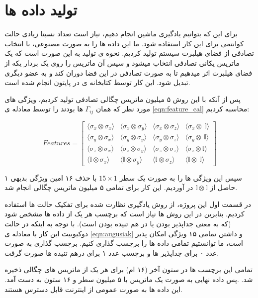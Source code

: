 \section{تولید داده ها}

برای این که بتوانیم یادگیری ماشین انجام دهیم، نیاز است تعداد نسبتا زیادی حالت کوانتمی برای این کار استفاده شود.
ما این داده ها را به صورت مصنوعی، با انتخاب تصادفی از فضای هیلبرت سیستم تولید کردیم.
نحوه ی تولید به این صورت است که یک ماتریس یکانی تصادفی انتخاب میشود و سپس آن ماتریس را روی یک بردار یکه از فضای هیلبرت اثر میدهیم تا به صورت تصادفی در این فضا دوران کند و به عضو دیگری تبدیل شود.
این کار توسط کتابخانه ی
در پایتون انجام شده است.

پس از آنکه با این روش ۵ میلیون ماتریس چگالی تصادفی تولید کردیم، ویژگی های مورد نظر که همان
$\Gamma_{ij}$
ها بودند را توسط معادله ی
\ref{eqn:feature_cal}
محاسبه کردیم:

\[
   Features =
  \left[ {\begin{array}{cccc}
\langle\sigma_x\otimes\sigma_x\rangle & \langle\sigma_x\otimes\sigma_y\rangle & \langle\sigma_x\otimes\sigma_z\rangle & \langle\sigma_x\otimes\ \mathbb{I}\rangle
\\ \langle\sigma_y\otimes\sigma_x\rangle & \langle\sigma_y\otimes\sigma_y\rangle & \langle\sigma_y\otimes\sigma_z\rangle & \langle\sigma_y\otimes\ \mathbb{I}\rangle
\\ \langle\sigma_z\otimes\sigma_x\rangle & \langle\sigma_z\otimes\sigma_y\rangle & \langle\sigma_z\otimes\sigma_z\rangle & \langle\sigma_z\otimes \mathbb{I}\rangle
\\ \langle\mathbb{I}\otimes\sigma_x\rangle & \langle\mathbb{I}\otimes\sigma_y\rangle & \langle\mathbb{I}\otimes\sigma_z\rangle &    \langle\mathbb{I}\otimes\ \mathbb{I}\rangle
  \end{array} } \right]
\]


سپس این ويژگی ها را به صورت یک سطر
$15 \times 1$
با حذف ۱۶ امین ویژگی بدیهی ۱ حاصل از
$ \mathbb{I} \otimes \mathbb{I}$
در آوردیم. این کار برای تمامی ۵ میلیون ماتریس چگالی انجام شد.

در قسمت اول این پروژه، از روش یادگیری نظارت شده برای تفکیک حالت ها استفاده کردیم. بنابرین در این روش ها نیاز است که برچسب
هر یک از داده ها مشخص شود (که به معنی جداپذیر بودن یا در هم تنیده بودن است).
با توجه به اینکه در حالت دوکیوبیت این کار با معادله ی
\ref{eqn:augusiak}
و داشتن تمامی ۱۵ ویژگی امکان پذیر است، ما توانستیم تمامی داده ها را برچسب گذاری کنیم.
برچسب گذاری به صورت عدد ۰ برای جداپذیر ها و برچسب عدد ۱ برای درهم تنیده ها صورت گرفت.

تمامی این برچسب ها در ستون آخر (۱۶ ام) برای هر یک از ماتریس های چگالی ذخیره شد.
.پس داده نهایی به صورت یک ماتریس با ۵ میلیون سطر و ۱۶ ستون به دست آمد.
این داده ها به صورت عمومی از اینترنت
قابل دسترس هستند.


